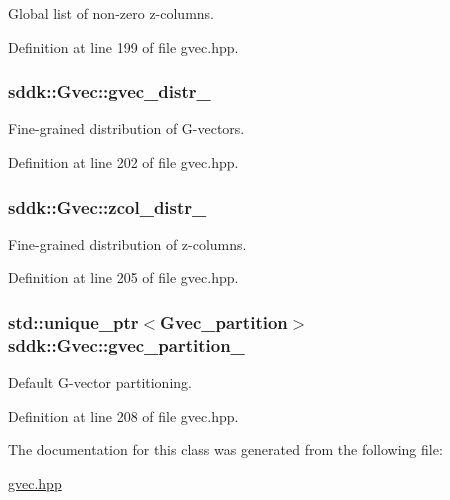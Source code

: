 Global list of non-\/zero z-\/columns. 



Definition at line 199 of file gvec.\+hpp.

\hypertarget{classsddk_1_1_gvec_a8f926d0894f62ca49404456d796c8d75}{}
\subsubsection[{gvec\+\_\+distr\+\_\+}]{ sddk\+::\+Gvec\+::gvec\+\_\+distr\+\_\+\hspace{0.3cm}{\ttfamily [private]}}\label{classsddk_1_1_gvec_a8f926d0894f62ca49404456d796c8d75}


Fine-\/grained distribution of G-\/vectors. 



Definition at line 202 of file gvec.\+hpp.

\hypertarget{classsddk_1_1_gvec_a6f815b24a297f72ef7b974b046b2ec24}{}
\subsubsection[{zcol\+\_\+distr\+\_\+}]{ sddk\+::\+Gvec\+::zcol\+\_\+distr\+\_\+\hspace{0.3cm}{\ttfamily [private]}}\label{classsddk_1_1_gvec_a6f815b24a297f72ef7b974b046b2ec24}


Fine-\/grained distribution of z-\/columns. 



Definition at line 205 of file gvec.\+hpp.

\hypertarget{classsddk_1_1_gvec_ae3f8dc02f9cc4f86bb3f92b145e31384}{}
\subsubsection[{gvec\+\_\+partition\+\_\+}]{\setlength{\rightskip}{0pt plus 5cm}std\+::unique\+\_\+ptr$<${\bf Gvec\+\_\+partition}$>$ sddk\+::\+Gvec\+::gvec\+\_\+partition\+\_\+\hspace{0.3cm}{\ttfamily [private]}}\label{classsddk_1_1_gvec_ae3f8dc02f9cc4f86bb3f92b145e31384}


Default G-\/vector partitioning. 



Definition at line 208 of file gvec.\+hpp.



The documentation for this class was generated from the following file\+:\begin{DoxyCompactItemize}
\item 
\hyperlink{gvec_8hpp}{gvec.\+hpp}\end{DoxyCompactItemize}
